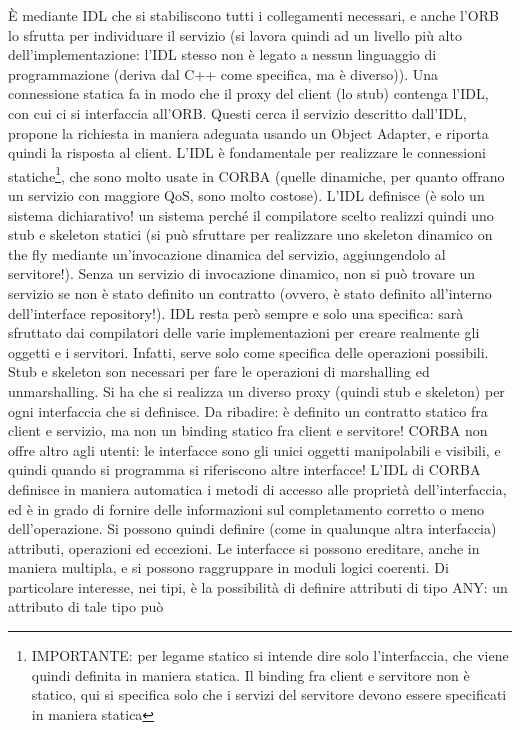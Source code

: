 È mediante IDL che si stabiliscono tutti i collegamenti necessari, e anche l'ORB lo sfrutta per individuare il servizio 
(si lavora quindi ad un livello più alto dell'implementazione: l'IDL stesso non è legato a nessun linguaggio di 
programmazione (deriva dal C++ come specifica, ma è diverso)). Una connessione statica fa in modo che il proxy del 
client (lo stub) contenga l'IDL, con cui ci si interfaccia all'ORB. Questi cerca il servizio descritto dall'IDL, propone 
la richiesta in maniera adeguata usando un Object Adapter, e riporta quindi la risposta al client.
L'IDL è fondamentale per realizzare le connessioni statiche\footnote{IMPORTANTE: per legame statico si intende dire solo 
l'interfaccia, che viene quindi definita in maniera statica. Il binding fra client e servitore non è statico, qui si 
specifica solo che i servizi del servitore devono essere specificati in maniera statica}, che sono molto usate in CORBA 
(quelle dinamiche, per quanto offrano un servizio con maggiore QoS, sono molto costose). L'IDL definisce (è solo un 
sistema dichiarativo! un sistema perché il compilatore scelto realizzi quindi uno stub e skeleton statici (si può 
sfruttare per realizzare uno skeleton dinamico on the fly mediante un'invocazione dinamica del servizio, aggiungendolo 
al servitore!). Senza un servizio di invocazione dinamico, non si può trovare un servizio se non è stato definito un 
contratto (ovvero, è stato definito all'interno dell'interface repository!).
IDL resta però sempre e solo una specifica: sarà sfruttato dai compilatori delle varie implementazioni per creare 
realmente gli oggetti e i servitori. Infatti, serve solo come specifica delle operazioni possibili.
Stub e skeleton son necessari per fare le operazioni di marshalling ed unmarshalling. Si ha che si realizza un diverso
proxy (quindi stub e skeleton) per ogni interfaccia che si definisce.
Da ribadire: è definito un contratto statico fra client e servizio, ma non un binding statico fra client e servitore!
CORBA non offre altro agli utenti: le interfacce sono gli unici oggetti manipolabili e visibili, e quindi quando si
programma si riferiscono altre interfacce!
L'IDL di CORBA definisce in maniera automatica i metodi di accesso alle proprietà dell'interfaccia, ed è in grado di 
fornire delle informazioni sul completamento corretto o meno dell'operazione. Si possono quindi definire (come
in qualunque altra interfaccia) attributi, operazioni ed eccezioni. Le interfacce si possono ereditare, anche in maniera 
multipla, e si possono raggruppare in moduli logici coerenti.
Di particolare interesse, nei tipi, è la possibilità di definire attributi di tipo ANY: un attributo di tale tipo può 

